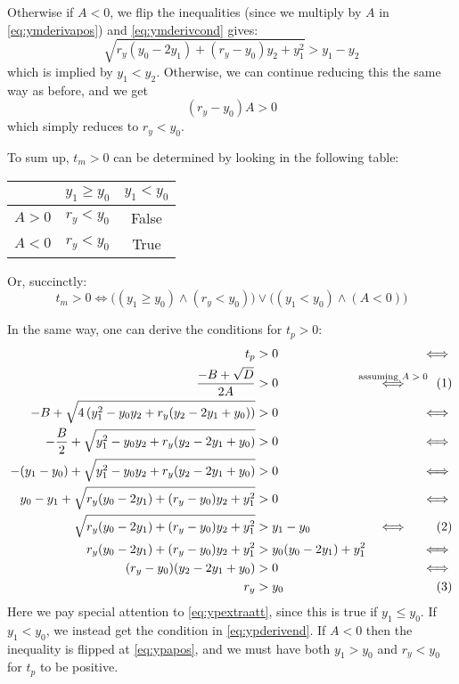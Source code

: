 \documentclass[11pt, a4paper]{article}
\newcommand{\numberhere}{\stepcounter{equation}\tag{\theequation}}
\begin{document}
Otherwise if $A < 0$, we flip the inequalities (since we multiply by $A$ in \eqref{eq:ymderivapos}) and \eqref{eq:ymderivcond} gives:
\begin{equation*}
\sqrt{r_y(y_0-2y_1)+(r_y-y_0)y_2+y_1^2} > y_1-y_2
\end{equation*}
which is implied by $y_1 < y_2$. Otherwise, we can continue reducing this the same way as before, and we get
\begin{equation*}
(r_y-y_0)A > 0
\end{equation*}
which simply reduces to $r_y < y_0$.

To sum up, $t_m > 0$ can be determined by looking in the following table:
\begin{table}[H]
\centering
\begin{tabular}{c|c|c}
& $y_1 \geq y_0$ & $y_1 < y_0$ \\\hline
$A > 0$ & $r_y < y_0$ & False\\\hline
$A < 0$ & $r_y < y_0 $ & True
\end{tabular}
\end{table}
Or, succinctly:
\begin{equation*}
t_m > 0 \iff \big((y_1 \geq y_0) \land (r_y < y_0)\big) \lor \big((y_1 < y_0) \land (A < 0)\big)
\end{equation*}

In the same way, one can derive the conditions for $t_p > 0$:
\begin{align*}
t_p &> 0 & \iff\\
\frac{-B+\sqrt{D}}{2A} &> 0 &\overset{\mathclap{\text{assuming $A > 0$}}}\iff\numberhere\label{eq:ypapos}\\
-B+\sqrt{4\left(y_1^2 - y_0y_2 + r_y(y_2 - 2y_1 + y_0)\right)} &> 0 & \iff\\
-\frac B2 + \sqrt{y_1^2 - y_0y_2 + r_y(y_2 - 2y_1 + y_0)} &> 0 & \iff\\
-(y_1-y_0)+\sqrt{y_1^2 - y_0y_2 + r_y(y_2 - 2y_1 + y_0)} &> 0 & \iff\\
y_0-y_1+\sqrt{r_y(y_0-2y_1)+(r_y-y_0)y_2+y_1^2} &> 0 & \iff\\
\sqrt{r_y(y_0-2y_1)+(r_y-y_0)y_2+y_1^2} &> y_1-y_0 & \iff\numberhere\label{eq:ypextraatt}\\
r_y(y_0-2y_1)+(r_y-y_0)y_2+y_1^2 &> y_0(y_0-2y_1)+y_1^2 &\iff\\
(r_y-y_0)(y_2-2y_1+y_0) &> 0 &\iff\\
r_y &> y_0&\numberhere\label{eq:ypderivend}
\end{align*}
Here we pay special attention to \eqref{eq:ypextraatt}, since this is true if $y_1 \leq y_0$. If $y_1 < y_0$, we instead get the condition in \eqref{eq:ypderivend}. If $A < 0$ then the inequality is flipped at \eqref{eq:ypapos}, and we must have both $y_1 > y_0$ and $r_y < y_0$ for $t_p$ to be positive.
\end{document}
